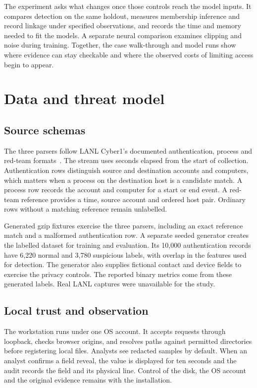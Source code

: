 \documentclass[conference]{IEEEtran}
\begin{document}
The experiment asks what changes once those controls reach the model inputs. It compares detection on the same holdout, measures membership inference and record linkage under specified observations, and records the time and memory needed to fit the models. A separate neural comparison examines clipping and noise during training. Together, the case walk-through and model runs show where evidence can stay checkable and where the observed costs of limiting access begin to appear.

\newpage
\section{Data and threat model}
\subsection{Source schemas}
The three parsers follow LANL Cyber1's documented authentication, process and red-team formats~\cite{kent}. The stream uses seconds elapsed from the start of collection. Authentication rows distinguish source and destination accounts and computers, which matters when a process on the destination host is a candidate match. A process row records the account and computer for a start or end event. A red-team reference provides a time, source account and ordered host pair. Ordinary rows without a matching reference remain unlabelled.

Generated gzip fixtures exercise the three parsers, including an exact reference match and a malformed authentication row. A separate seeded generator creates the labelled dataset for training and evaluation. Its 10,000 authentication records have 6,220 normal and 3,780 suspicious labels, with overlap in the features used for detection. The generator also supplies fictional contact and device fields to exercise the privacy controls. The reported binary metrics come from these generated labels. Real LANL captures were unavailable for the study.

\subsection{Local trust and observation}
The workstation runs under one OS account. It accepts requests through loopback, checks browser origins, and resolves paths against permitted directories before registering local files. Analysts see redacted samples by default. When an analyst confirms a field reveal, the value is displayed for ten seconds and the audit records the field and its physical line. Control of the disk, the OS account and the original evidence remains with the installation.
\end{document}
